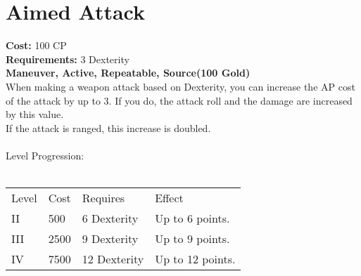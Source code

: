 \section{Aimed Attack}\label{maneuver:aimedAttack}
\textbf{Cost:} 100 CP\\
\textbf{Requirements:} 3 Dexterity\\
\textbf{Maneuver, Active, Repeatable, Source(100 Gold)}\\
When making a weapon attack based on Dexterity, you can increase the AP cost of the attack by up to 3.
If you do, the attack roll and the damage are increased by this value.\\
If the attack is ranged, this increase is doubled.\\
\\
Level Progression:\\
\\
\begin{tabular}{l | l | l | l}
	Level & Cost & Requires & Effect\\
	II & 500 & 6 Dexterity & Up to 6 points.\\
	III & 2500 & 9 Dexterity & Up to 9 points.\\
	IV & 7500 & 12 Dexterity & Up to 12 points.\\
\end{tabular}